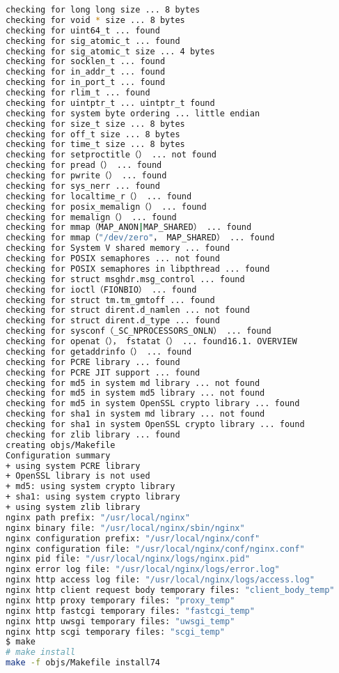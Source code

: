 \begin{lstlisting}[language=bash]
checking for long long size ... 8 bytes
checking for void * size ... 8 bytes
checking for uint64_t ... found
checking for sig_atomic_t ... found
checking for sig_atomic_t size ... 4 bytes
checking for socklen_t ... found
checking for in_addr_t ... found
checking for in_port_t ... found
checking for rlim_t ... found
checking for uintptr_t ... uintptr_t found
checking for system byte ordering ... little endian
checking for size_t size ... 8 bytes
checking for off_t size ... 8 bytes
checking for time_t size ... 8 bytes
checking for setproctitle（） ... not found
checking for pread（） ... found
checking for pwrite（） ... found
checking for sys_nerr ... found
checking for localtime_r（） ... found
checking for posix_memalign（） ... found
checking for memalign（） ... found
checking for mmap（MAP_ANON|MAP_SHARED） ... found
checking for mmap（"/dev/zero"， MAP_SHARED） ... found
checking for System V shared memory ... found
checking for POSIX semaphores ... not found
checking for POSIX semaphores in libpthread ... found
checking for struct msghdr.msg_control ... found
checking for ioctl（FIONBIO） ... found
checking for struct tm.tm_gmtoff ... found
checking for struct dirent.d_namlen ... not found
checking for struct dirent.d_type ... found
checking for sysconf（_SC_NPROCESSORS_ONLN） ... found
checking for openat（）， fstatat（） ... found16.1. OVERVIEW
checking for getaddrinfo（） ... found
checking for PCRE library ... found
checking for PCRE JIT support ... found
checking for md5 in system md library ... not found
checking for md5 in system md5 library ... not found
checking for md5 in system OpenSSL crypto library ... found
checking for sha1 in system md library ... not found
checking for sha1 in system OpenSSL crypto library ... found
checking for zlib library ... found
creating objs/Makefile
Configuration summary
+ using system PCRE library
+ OpenSSL library is not used
+ md5: using system crypto library
+ sha1: using system crypto library
+ using system zlib library
nginx path prefix: "/usr/local/nginx"
nginx binary file: "/usr/local/nginx/sbin/nginx"
nginx configuration prefix: "/usr/local/nginx/conf"
nginx configuration file: "/usr/local/nginx/conf/nginx.conf"
nginx pid file: "/usr/local/nginx/logs/nginx.pid"
nginx error log file: "/usr/local/nginx/logs/error.log"
nginx http access log file: "/usr/local/nginx/logs/access.log"
nginx http client request body temporary files: "client_body_temp"
nginx http proxy temporary files: "proxy_temp"
nginx http fastcgi temporary files: "fastcgi_temp"
nginx http uwsgi temporary files: "uwsgi_temp"
nginx http scgi temporary files: "scgi_temp"
$ make
# make install
make -f objs/Makefile install74


\end{lstlisting}
